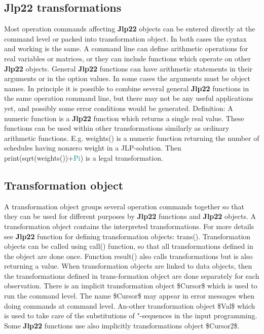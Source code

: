 {\begin{itemize}
\begin{itemize}
\section{\textbf{Jlp22} transformations} 
\label{jtrans} 
Most operation commands affecting \textbf{Jlp22} objects can be entered directly at the command level or 
packed into transformation object. In both cases the syntax and working is the same. A 
command line can define arithmetic operations for real variables or matrices, or they can 
include functions which operate on other \textbf{Jlp22} objects. General \textbf{Jlp22} functions can have arithmetic 
statements in their arguments or in the option values. In some cases the arguments must be 
object names. In principle it is possible to combine several general \textbf{Jlp22} functions in the same 
operation command line, but there may not be any useful applications yet, and possibly some 
error conditions would be generated. 
Definition: A numeric function is a \textbf{Jlp22} function which returns a single real value. These functions 
can be used within other transformations similarly as ordinary arithmetic functions. E.g. 
\textcolor{VioletRed}{weights}() is a numeric function returning the number of schedules having nonzero weight 
in a JLP-solution. Then \textcolor{VioletRed}{print}(\textcolor{VioletRed}{sqrt}(\textcolor{VioletRed}{weights}())+\textcolor{teal}{Pi}) is a legal transformation. 
\subsection{Transformation object} 
\label{transo} 
A transformation object groups several operation commands together so that they 
can be used for different purposes by \textbf{Jlp22} functions and \textbf{Jlp22} objects. A 
transformation object contains the interpreted transformations. For more details 
see \textbf{Jlp22} function for defining transformation objects: \textcolor{VioletRed}{trans}(). 
Transformation objects can be called using \textcolor{VioletRed}{call}() function, so that all 
transformations defined in the object are done once. Function result() also calls 
transformations but is also returning a value. When transformation objects are 
linked to data objects, then the transformations defined in trans-formation object 
are done separately for each observation. 
There is an implicit transformation object \$Cursor\$ which is used to run the 
command level. The name \$Cursor\$ may appear in error messages when doing 
commands at command level.  An-other transformation object \$Val\$ which is used to 
take care of the substitutions of "-sequences in the input programming. Some \textbf{Jlp22} 
functions use also implicitly transformations object \$Cursor2\$. 

\end{itemize}
\end{itemize}}
